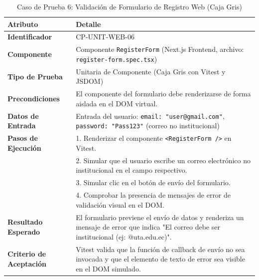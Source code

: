 \documentclass{article}
\begin{document}
\begin{table}[H]
\centering
\small
\caption{Caso de Prueba 6: Validación de Formulario de Registro Web (Caja Gris)}
\begin{tabularx}{\linewidth}{p{4cm} X}
\toprule
\textbf{Atributo} & \textbf{Detalle} \\
\midrule
\textbf{Identificador} & CP-UNIT-WEB-06 \\
\textbf{Componente} & Componente \texttt{RegisterForm} (Next.js Frontend, archivo: \texttt{register-form.spec.tsx}) \\
\textbf{Tipo de Prueba} & Unitaria de Componente (Caja Gris con Vitest y JSDOM) \\
\textbf{Precondiciones} & El componente del formulario debe renderizarse de forma aislada en el DOM virtual. \\
\textbf{Datos de Entrada} & Entrada del usuario: \texttt{email: "user@gmail.com"}, \texttt{password: "Pass123"} (correo no institucional) \\
\textbf{Pasos de Ejecución} & 1. Renderizar el componente \texttt{<RegisterForm />} en Vitest.\\
& 2. Simular que el usuario escribe un correo electrónico no institucional en el campo respectivo.\\
& 3. Simular clic en el botón de envío del formulario.\\
& 4. Comprobar la presencia de mensajes de error de validación visual en el DOM.\\
\textbf{Resultado Esperado} & El formulario previene el envío de datos y renderiza un mensaje de error que indica "El correo debe ser institucional (ej: @uta.edu.ec)". \\
\textbf{Criterio de Aceptación} & Vitest valida que la función de callback de envío no sea invocada y que el elemento de texto de error sea visible en el DOM simulado. \\
\bottomrule
\end{tabularx}
\end{table}
\end{document}
